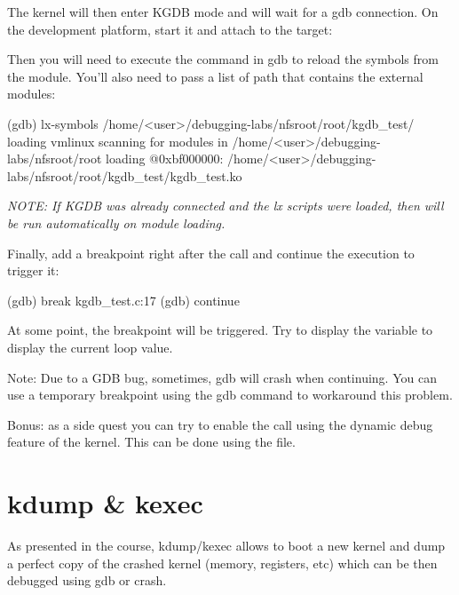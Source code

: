 The kernel will then enter KGDB mode and will wait for a gdb connection. On the
development platform, start it and attach to the target:


Then you will need to execute the  command in gdb to reload the
symbols from the module. You'll also need to pass a list of path that contains
the external modules:

\begin{bashinput}
(gdb) lx-symbols /home/<user>/debugging-labs/nfsroot/root/kgdb_test/
loading vmlinux
scanning for modules in /home/<user>/debugging-labs/nfsroot/root
loading @0xbf000000: /home/<user>/debugging-labs/nfsroot/root/kgdb_test/kgdb_test.ko
\end{bashinput}

{\em NOTE: If KGDB was already connected and the lx scripts were loaded, then
 will be run automatically on module loading.}

Finally, add a breakpoint right after the  call and continue
the execution to trigger it:

\begin{bashinput}
(gdb) break kgdb_test.c:17
(gdb) continue
\end{bashinput}

At some point, the breakpoint will be triggered. Try to display the variable
 to display the current loop value.

Note: Due to a GDB bug, sometimes, gdb will crash when continuing. You can
use a temporary breakpoint using the gdb  command to workaround
this problem.

Bonus: as a side quest you can try to enable the  call using
the dynamic debug feature of the kernel. This can be done using the
 file.

\section{kdump \& kexec}

As presented in the course, kdump/kexec allows to boot a new kernel and dump a
perfect copy of the crashed kernel (memory, registers, etc) which can be then
debugged using gdb or crash. 

